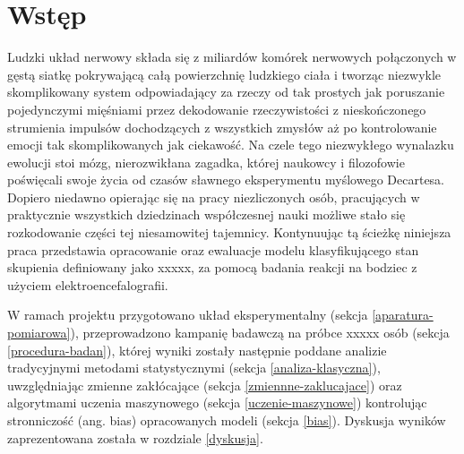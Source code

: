 \documentclass{./assets/wfis}
\begin{document}

\stronatytulowa

\begin{abstract}

\end{abstract}

\chapter{Wstęp}
Ludzki układ nerwowy składa się z miliardów komórek nerwowych połączonych w gęstą siatkę pokrywającą całą powierzchnię ludzkiego ciała i tworząc niezwykle skomplikowany system odpowiadający za rzeczy od tak prostych jak poruszanie pojedynczymi mięśniami przez dekodowanie rzeczywistości z nieskończonego strumienia impulsów dochodzących z wszystkich zmysłów aż po kontrolowanie emocji tak skomplikowanych jak ciekawość.
Na czele tego niezwykłego wynalazku ewolucji stoi mózg, nierozwikłana zagadka, której naukowcy i filozofowie poświęcali swoje życia od czasów sławnego eksperymentu myślowego Decartesa. Dopiero niedawno opierając się na pracy niezliczonych osób, pracujących w praktycznie wszystkich dziedzinach współczesnej nauki możliwe stało się rozkodowanie części tej niesamowitej tajemnicy. Kontynuując tą ścieżkę niniejsza praca przedstawia opracowanie oraz ewaluacje modelu klasyfikującego stan skupienia definiowany jako  xxxxx, za pomocą badania reakcji na bodziec z użyciem elektroencefalografii. 

W ramach projektu przygotowano układ eksperymentalny (sekcja \ref{aparatura-pomiarowa}), przeprowadzono kampanię badawczą na próbce xxxxx osób (sekcja \ref{procedura-badan}), której wyniki zostały następnie poddane analizie tradycyjnymi metodami statystycznymi (sekcja \ref{analiza-klasyczna}), uwzględniając zmienne zakłócające (sekcja \ref{zmiennne-zaklucajace}) oraz algorytmami uczenia maszynowego (sekcja \ref{uczenie-maszynowe}) kontrolując stronniczość (ang. bias) opracowanych modeli (sekcja \ref{bias}). Dyskusja wyników zaprezentowana została w rozdziale \ref{dyskusja}.
\end{document}
